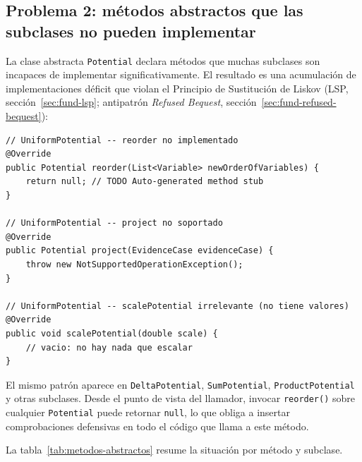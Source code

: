 \documentclass[11pt,a4paper]{article}
\newcommand{\code}[1]{\texttt{#1}}
\begin{document}
\subsection{Problema 2: métodos abstractos que las subclases no pueden implementar}
\label{sec:prob2}

La clase abstracta \code{Potential} declara métodos que muchas subclases son
incapaces de implementar significativamente.  El resultado es una acumulación de
implementaciones déficit que violan el Principio de Sustitución de Liskov
(LSP, sección~\ref{sec:fund-lsp}; antipatrón \emph{Refused Bequest},
sección~\ref{sec:fund-refused-bequest}):

\begin{lstlisting}[caption={Implementaciones forzadas que no tienen sentido para la subclase}]
// UniformPotential -- reorder no implementado
@Override
public Potential reorder(List<Variable> newOrderOfVariables) {
    return null; // TODO Auto-generated method stub
}

// UniformPotential -- project no soportado
@Override
public Potential project(EvidenceCase evidenceCase) {
    throw new NotSupportedOperationException();
}

// UniformPotential -- scalePotential irrelevante (no tiene valores)
@Override
public void scalePotential(double scale) {
    // vacio: no hay nada que escalar
}
\end{lstlisting}

El mismo patrón aparece en \code{DeltaPotential}, \code{SumPotential},
\code{ProductPotential} y otras subclases.  Desde el punto de vista del llamador,
invocar \code{reorder()} sobre cualquier \code{Potential} puede retornar
\code{null}, lo que obliga a insertar comprobaciones defensivas en todo el código
que llama a este método.

La tabla~\ref{tab:metodos-abstractos} resume la situación por método y
subclase.
\end{document}
